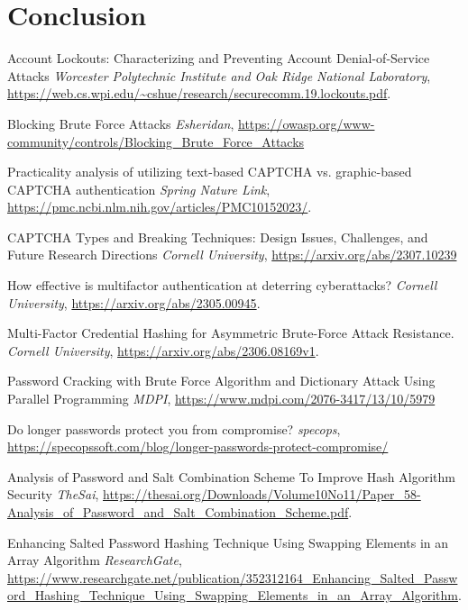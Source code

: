 \documentclass{comjnl}
\begin{document}
\section{Conclusion}

\begin{thebibliography}{99}

   Account Lockouts: Characterizing and Preventing Account Denial-of-Service Attacks
  \textit{Worcester Polytechnic Institute and Oak Ridge National Laboratory}, \url{https://web.cs.wpi.edu/~cshue/research/securecomm.19.lockouts.pdf}.

   Blocking Brute Force Attacks
  \textit{Esheridan}, \url{https://owasp.org/www-community/controls/Blocking_Brute_Force_Attacks}


   Practicality analysis of utilizing text-based CAPTCHA vs. graphic-based CAPTCHA authentication
  \textit{Spring Nature Link}, \url{https://pmc.ncbi.nlm.nih.gov/articles/PMC10152023/}.

   CAPTCHA Types and Breaking Techniques: Design Issues, Challenges, and Future Research Directions
  \textit{Cornell University}, \url{https://arxiv.org/abs/2307.10239}
  

   How effective is multifactor authentication at deterring cyberattacks? 
  \textit{Cornell University}, \url{https://arxiv.org/abs/2305.00945}.
  
   Multi-Factor Credential Hashing for Asymmetric Brute-Force Attack Resistance.
  \textit{Cornell University}, \url{https://arxiv.org/abs/2306.08169v1}.

   Password Cracking with Brute Force Algorithm and Dictionary Attack Using Parallel Programming
  \textit{MDPI}, \url {https://www.mdpi.com/2076-3417/13/10/5979}

   Do longer passwords protect you from compromise?
  \textit{specops}, \url {https://specopssoft.com/blog/longer-passwords-protect-compromise/}

   Analysis of Password and Salt Combination Scheme To Improve Hash Algorithm Security
  \textit{TheSai}, \url{https://thesai.org/Downloads/Volume10No11/Paper_58-Analysis_of_Password_and_Salt_Combination_Scheme.pdf}.

   Enhancing Salted Password Hashing Technique Using Swapping Elements in an Array Algorithm
  \textit{ResearchGate}, \url{https://www.researchgate.net/publication/352312164_Enhancing_Salted_Password_Hashing_Technique_Using_Swapping_Elements_in_an_Array_Algorithm}.
  
\end{thebibliography}




\end{document}
